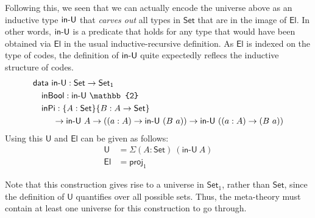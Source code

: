 \documentclass{easychair}
\newcommand{\ad}[1]{\AgdaFunction{#1}}
\newcommand{\Set}{\textsf{Set}}
\newcommand{\U}{\textsf{U}}
\newcommand{\El}{\textsf{El}}
\providecommand\mathbbm{\mathbb}
\begin{document}
Following this, we seen that we can actually encode the universe above as an
inductive type $\ad{in-U}$ that \emph{carves out} all types in $\Set$ that are
in the image of $\El$. In other words, $\ad{in-U}$ is a predicate that holds for
any type that would have been obtained via $\El$ in the usual
inductive-recursive definition. As $\El$ is indexed on the type of codes, the
definition of $\ad{in-U}$ quite expectedly reflecs the inductive structure of
codes.
%
\begin{align*}
  & \textsf{data}\ \ad{in-U} : \Set \to \Set_1 \\
  & \quad \textsf{inBool} : \textsf{in-U}\ \mathbbm{2} \\
  & \quad \textsf{inPi}
  :  \{A : \Set\} \{B : A \to \Set\}\\
  & \ \qquad \to \ad{in-U}\ A
  \to ((a : A) \to \ad{in-U}\ (B\ a))
  \to \ad{in-U}\ ((a : A) \to (B\ a))
\end{align*}
Using this $\U$ and $\El$ can be given as follows:
\begin{align*}
  \U & = \Sigma (A : \Set)\ (\textsf{in-U}\ A) \\
  \El & = \textsf{proj}_1
\end{align*}

Note that this construction gives rise to a universe in $\Set_1$, rather than
$\Set$, since the definition of $\U$ quantifies over all possible sets. Thus,
the meta-theory must contain at least one universe for this construction to go
through.



\end{document}
